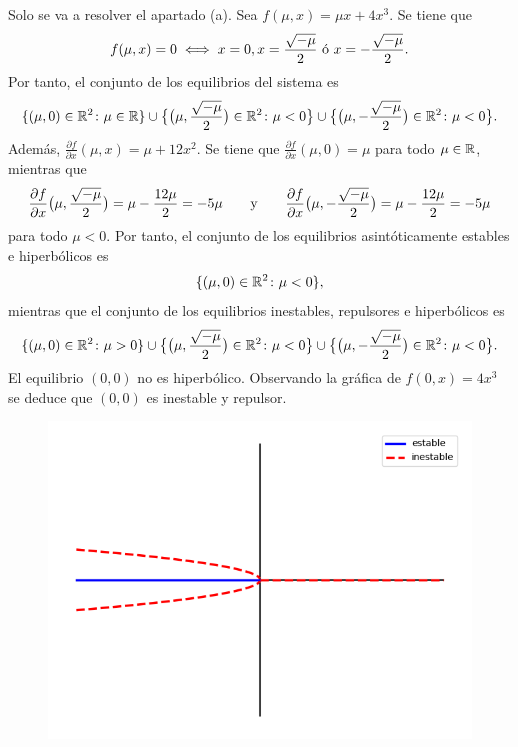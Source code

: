 \documentclass[11pt]{report}
\begin{document}
\begin{solution}
    Solo se va a resolver el apartado (a). Sea $f(\mu,x) = \mu x + 4x^3$. Se tiene que
    \begin{align*}
        f(\mu,x) = 0 \iff x = 0, x = \frac{\sqrt{-\mu}}{2} \textup{ ó } x = -\frac{\sqrt{-\mu}}{2}.
    \end{align*}
    Por tanto, el conjunto de los equilibrios del sistema es
    \[\{(\mu,0) \in\mathbb R^2 \colon \mu \in \mathbb R\} \cup \bigl\{\bigl(\mu, \frac{\sqrt{-\mu}}{2}\bigr) \in\mathbb R^2 \colon \mu < 0\bigr\} \cup \bigl\{\bigl(\mu, -\frac{\sqrt{-\mu}}{2}\bigr) \in\mathbb R^2 \colon \mu < 0\bigr\}.\]
    Además, $\frac{\partial f}{\partial x}(\mu,x) = \mu+12x^2$. Se tiene que $\frac{\partial f}{\partial x}(\mu,0) = \mu$ para todo $\mu\in\mathbb R$, mientras que \[\frac{\partial f}{\partial x}\bigl(\mu,\frac{\sqrt{-\mu}}{2}\bigr) = \mu-\frac{12\mu}{2} = -5\mu \qquad \textup{y} \qquad \frac{\partial f}{\partial x}\bigl(\mu,-\frac{\sqrt{-\mu}}{2}\bigr) = \mu-\frac{12\mu}{2} = -5\mu\] para todo $\mu < 0$. Por tanto, el conjunto de los equilibrios asintóticamente estables e hiperbólicos es
    \[\{(\mu,0) \in\mathbb R^2 \colon \mu < 0\},\]
    mientras que el conjunto de los equilibrios inestables, repulsores e hiperbólicos es
    \[\{(\mu,0) \in\mathbb R^2 \colon \mu > 0\} \cup \bigl\{\bigl(\mu, \frac{\sqrt{-\mu}}{2}\bigr) \in\mathbb R^2 \colon \mu < 0\bigr\} \cup \bigl\{\bigl(\mu, -\frac{\sqrt{-\mu}}{2}\bigr) \in\mathbb R^2 \colon \mu < 0\bigr\}.\]
    El equilibrio $(0,0)$ no es hiperbólico. Observando la gráfica de $f(0,x) = 4x^3$ se deduce que $(0,0)$ es inestable y repulsor.
    \begin{figure}[H]
        \centering
        \includegraphics[scale=0.5]{img/9.png}
    \end{figure}
\end{solution}
\end{document}
